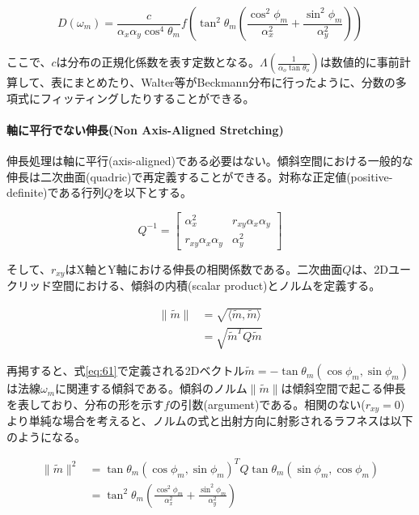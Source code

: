\documentclass[a4j,xelatex,ja=standard]{bxjsarticle}
\begin{document}
\begin{equation}
    D(\omega_m) = \frac{c}{\alpha_x \alpha_y \cos^4 \theta_m} f \left( \tan^2 \theta_m \left( \frac{\cos^2 \phi_m}{\alpha^2_x} + \frac{\sin^2 \phi_m}{\alpha^2_y} \right) \right)
    \label{eq:87}
\end{equation}

ここで、$c$は分布の正規化係数を表す定数となる。$\Lambda(\frac{1}{\alpha_o \tan\theta_o})$は数値的に事前計算して、表にまとめたり、Walter等がBeckmann分布に行ったように、分数の多項式にフィッティングしたりすることができる。

\paragraph{軸に平行でない伸長(Non Axis-Aligned Stretching)}

伸長処理は軸に平行(axis-aligned)である必要はない。傾斜空間における一般的な伸長は二次曲面(quadric)で再定義することができる。対称な正定値(positive-definite)である行列$Q$を以下とする。

\begin{equation}
    Q^{-1} =
    \begin{bmatrix}
        \alpha^2_x & r_{xy} \alpha_x \alpha_y \\
        r_{xy} \alpha_x \alpha_y & \alpha^2_y
    \end{bmatrix}
    \label{eq:88}
\end{equation}

そして、$r_{xy}$はX軸とY軸における伸長の相関係数である。二次曲面$Q$は、2Dユークリッド空間における、傾斜の内積(scalar product)とノルムを定義する。

\begin{equation}
    \begin{split}
        \|\tilde{m}\| & = \sqrt{\langle \tilde{m}, \tilde{m} \rangle} \\
                      & = \sqrt{\tilde{m}^T Q \tilde{m}}
    \end{split}
    \label{eq:89}
\end{equation}

再掲すると、式\eqref{eq:61}で定義される2Dベクトル$\tilde{m} = -\tan\theta_m(\cos\phi_m, \sin\phi_m)$は法線$\omega_m$に関連する傾斜である。傾斜のノルム$\|\tilde{m}\|$は傾斜空間で起こる伸長を表しており、分布の形を示す$f$の引数(argument)である。相関のない($r_{xy} = 0$)より単純な場合を考えると、ノルムの式と出射方向に射影されるラフネスは以下のようになる。

\begin{equation}
    \begin{split}
        \|\tilde{m}\|^2 & = \tan\theta_m(\cos\phi_m, \sin\phi_m)^T Q \tan\theta_m(\sin\phi_m, \cos\phi_m) \\
                        & = \tan^2 \theta_m \left( \frac{\cos^2 \phi_m}{\alpha^2_x} + \frac{\sin^2 \phi_m}{\alpha^2_y} \right)
    \end{split}
    \label{eq:90}
\end{equation}
\end{document}
